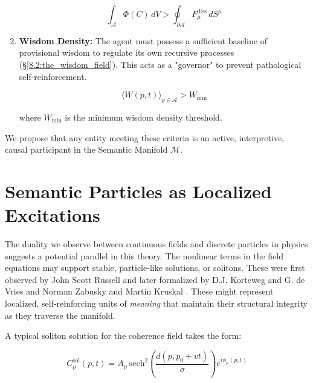 \begin{enumerate}
    \begin{equation}
        \int_{\mathcal{A}} \Phi(C) \, dV > \oint_{\partial \mathcal{A}} F_\mu^{\text{diss}} \, dS^\mu
    \end{equation}

    \item \textbf{Wisdom Density:} The agent must possess a sufficient baseline of provisional wisdom to regulate its own recursive processes (\S\ref{8.2:the_wisdom_field}). This acts as a "governor" to prevent pathological self-reinforcement.

    \begin{equation}
        \langle W(p,t) \rangle_{p \in \mathcal{A}} > W_{\text{min}}
    \end{equation}
    
    where \(W_{\text{min}}\) is the minimum wisdom density threshold.

\end{enumerate}

We propose that any entity meeting these criteria is an active, interpretive, causal participant in the Semantic Manifold \(\mathcal{M}\).


\section{Semantic Particles as Localized Excitations}
\label{13.6:semantic_particles_as_localized_excitations}

The duality we observe between continuous fields and discrete particles in physics suggests a potential parallel in this theory. The nonlinear terms in the field equations may support stable, particle-like solutions, or solitons. These were first observed by John Scott Russell \autocite{Russell1845} and later formalized by D.J. Korteweg and G. de Vries \autocite{KortewegdeVries1895} and Norman Zabusky and Martin Kruskal \autocite{ZabuskyKruskal1965}. These might represent localized, self-reinforcing units of \textit{meaning} that maintain their structural integrity as they traverse the manifold.

A typical soliton solution for the coherence field takes the form:

\begin{equation}
C_\mu^{\mathrm{sol}}(p, t) = A_\mu\, \mathrm{sech}^2\left(\frac{d(p, p_0 + vt)}{\sigma}\right) e^{i\phi_\mu(p, t)}
\end{equation}

